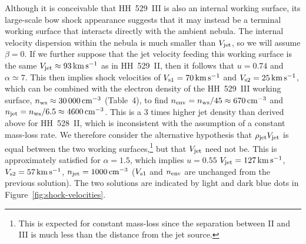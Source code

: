 \documentclass[useAMS, usenatbib]{mnras}
\begin{document}
Although it is conceivable that HH~529~III is also an internal working surface, its large-scale bow shock appearance suggests that it may instead be a terminal working surface that interacts directly with the ambient nebula.  The internal velocity dispersion within the nebula \citetext{\(\approx \SI{6}{km.s^{-1}}\), \citealp{Arthur:2016a}}
is much smaller than \(V_{\mathrm{jet}}\), so we will assume \(\beta = 0\).
If we further suppose that the jet velocity feeding this working surface is the same \(V_{\mathrm{jet}} \approx \SI{93}{km.s^{-1}}\)
as in HH~529~II, then it follows that \(u = 0.74\) and \(\alpha \simeq 7\).
This then implies shock velocities of \(V_{\text{s1}} = \SI{70}{km.s^{-1}}\)
and \(V_{\text{s2}} = \SI{25}{km.s^{-1}}\),
which can be combined with the electron density of the HH~529~III working surface, 
\(n_{\mathrm{ws}} \approx \SI{30000}{cm^{-3}}\) (Table~4),
to find \(n_{\mathrm{env}} = n_{\mathrm{ws}} / 45 \approx \SI{670}{cm^{-3}}\)
and \(n_{\mathrm{jet}} = n_{\mathrm{ws}} / 6.5 \approx \SI{4600}{cm^{-3}}\).
This is a 3 times higher jet density than derived above for HH~528~II,
which is inconsistent with the assumption of a constant mass-loss rate.
We therefore consider the alternative hypothesis that \(\rho_{\mathrm{jet}} V_{\mathrm{jet}}\)
is equal between the two working surfaces,\footnote{
  This is expected for constant mass-loss since the separation
  between II and III
  is much less than the distance from the jet source. 
}
but that \(V_{\mathrm{jet}}\) need not be.
This is approximately satisfied for \(\alpha = 1.5\), which implies \(u = 0.55\)
\(V_{\mathrm{jet}} = \SI{127}{km.s^{-1}}\), \(V_{\text{s2}} = \SI{57}{km.s^{-1}}\), \(n_{\mathrm{jet}} = \SI{1000}{cm^{-3}}\) (\(V_{\text{s1}}\) and \(n_{\mathrm{env}}\) are unchanged from the previous solution).
The two solutions are indicated by light and dark blue dots in Figure~\ref{fig:shock-velocities}. 
\end{document}
